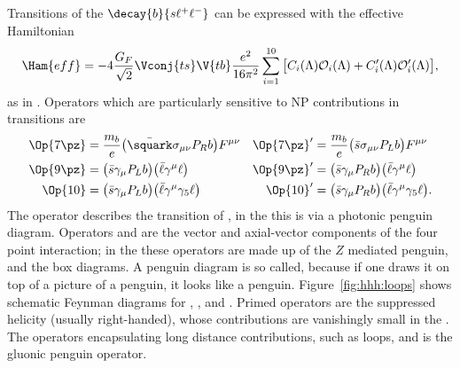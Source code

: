 Transitions of the \fcnc $\decay{b}{s\ell^+\ell^-}$ can be expressed with the effective Hamiltonian
\begin{equation}
  \Ham{eff} = -4\frac{G_F}{\sqrt{2}}\Vconj{ts}\V{tb}\frac{e^2}{16\pi^2}
  \sum_{i=1}^{10}\big[C_i(\Lambda)\mathcal{O}_i(\Lambda)
    +C_i^\prime(\Lambda)\mathcal{O}_i^\prime(\Lambda)\big],
\end{equation}
as in . %
Operators which are particularly sensitive to NP contributions in  transitions are
\begin{align}
  \Op{7\pz} &= \frac{m_b}{e}\big(\bar\squark\sigma_{\mu\nu}P_Rb\big)F^{\mu\nu}
  &\Op{7\pz}^\prime &= \frac{m_b}{e}\big(\bar s \sigma_{\mu\nu}P_Lb\big)F^{\mu\nu}
  \nonumber\\
  \Op{9\pz} &= \big(\bar s\gamma_\mu P_Lb\big)\big(\bar\ell\gamma^\mu\ell\big)
  &\Op{9\pz}^\prime &= \big(\bar s\gamma_\mu P_Rb\big)\big(\bar\ell\gamma^\mu\ell\big)
  \nonumber\\
  \Op{10} &= \big(\bar s\gamma_\mu P_Lb\big)\big(\bar\ell\gamma^\mu\gamma_5\ell\big)
  &\Op{10}^\prime &= \big(\bar s\gamma_\mu P_Rb\big)\big(\bar\ell\gamma^\mu\gamma_5\ell\big).
\end{align}
The operator  describes the transition of \decay{\bquark}{\squark\gamma}, in the \sm this is
via a photonic penguin diagram.
Operators  and  are the vector and axial-vector components of the four point
\decay{\bquark}{\squark\mumu} interaction; in the \sm these operators are made up of the $Z$
mediated penguin, and the \Wp box diagrams.
A penguin diagram is so called, because if one draws it on top of a picture of a penguin, it looks
like a penguin.
Figure~\ref{fig:hhh:loops} shows schematic Feynman diagrams for , , and .
Primed operators are the suppressed helicity (usually right-handed), whose contributions are
vanishingly small in the \sm.
The operators  encapsulating long distance contributions, such as \ccbar
loops, and  is the gluonic penguin operator.

